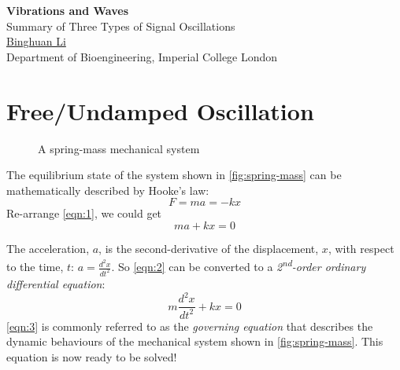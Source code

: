 \documentclass[12pt,a4paper]{article}
\begin{document}
\begin{center}
    {\LARGE \textbf{Vibrations and Waves}} \\ [1em]
    {\Large Summary of Three Types of Signal Oscillations} \\ [1em]
    {\href{mailto:binghuan.li19@imperial.ac.uk}{Binghuan Li}} \\
    {Department of Bioengineering, Imperial College London} 
\end{center}
\section{Free/Undamped Oscillation}

\begin{figure}[H]
    \centering

    \caption{A spring-mass mechanical system}
    \label{fig:spring-mass}
\end{figure}

The equilibrium state of the system shown in \autoref{fig:spring-mass} can be mathematically described by Hooke's law:
\begin{equation} \label{eqn:1}
    F = ma = -kx
\end{equation}
Re-arrange \autoref{eqn:1}, we could get
\begin{equation} \label{eqn:2}
    ma + kx = 0
\end{equation}

The acceleration, $a$, is the second-derivative of the displacement, $x$, with respect to the time, $t$: $\displaystyle a=\frac{d^{2}x}{dt^{2}}$. So \autoref{eqn:2}  can be converted to a \textit{2\textsuperscript{nd}-order ordinary differential equation}:
\begin{equation} \label{eqn:3}
    m\frac{d^{2}x}{dt^{2}}+kx=0
\end{equation}
\autoref{eqn:3} is commonly referred to as the \textit{governing equation} that describes the dynamic behaviours of the mechanical system shown in \autoref{fig:spring-mass}. This equation is now ready to be solved!
\end{document}
